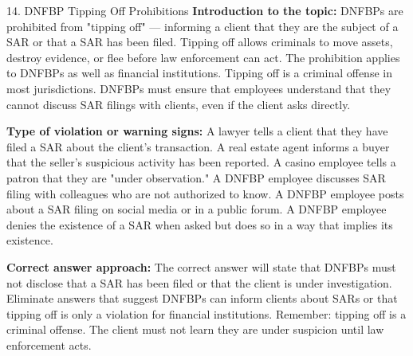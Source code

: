\documentclass[11pt,a4paper]{beamer}
\begin{document}
\begin{frame}{14. DNFBP Tipping Off Prohibitions}
\tiny
\noindent\textbf{Introduction to the topic:} DNFBPs are prohibited from "tipping off" — informing a client that they are the subject of a SAR or that a SAR has been filed. Tipping off allows criminals to move assets, destroy evidence, or flee before law enforcement can act. The prohibition applies to DNFBPs as well as financial institutions. Tipping off is a criminal offense in most jurisdictions. DNFBPs must ensure that employees understand that they cannot discuss SAR filings with clients, even if the client asks directly.

\vspace{0.1cm}
\noindent\textbf{Type of violation or warning signs:} A lawyer tells a client that they have filed a SAR about the client's transaction. A real estate agent informs a buyer that the seller's suspicious activity has been reported. A casino employee tells a patron that they are "under observation." A DNFBP employee discusses SAR filing with colleagues who are not authorized to know. A DNFBP employee posts about a SAR filing on social media or in a public forum. A DNFBP employee denies the existence of a SAR when asked but does so in a way that implies its existence.

\vspace{0.1cm}
\noindent\textbf{Correct answer approach:} The correct answer will state that DNFBPs must not disclose that a SAR has been filed or that the client is under investigation. Eliminate answers that suggest DNFBPs can inform clients about SARs or that tipping off is only a violation for financial institutions. Remember: tipping off is a criminal offense. The client must not learn they are under suspicion until law enforcement acts.
\end{frame}
\end{document}

